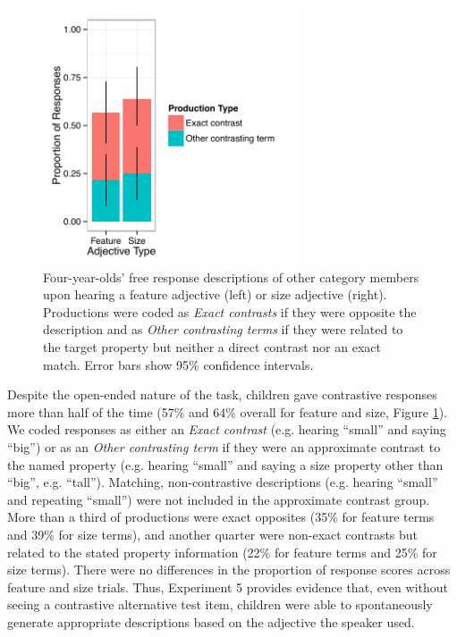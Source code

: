 \documentclass[man]{apa2}
\begin{document}
\begin{figure}[t] 
  \begin{center} 
    \includegraphics[width=3in]{figures/expt3.pdf} 
    \caption{\label{fig:freeResponse} Four-year-olds' free response descriptions of other category members upon hearing a feature adjective (left) or size adjective (right). Productions were coded as \emph{Exact contrasts} if they were opposite the description and as \emph{Other contrasting terms} if they were related to the target property but neither a direct contrast nor an exact match. Error bars show 95\% confidence intervals. }
  \end{center} 
\vspace{-10ex}
\end{figure}

Despite the open-ended nature of the task, children gave contrastive responses more than half of the time (57\% and 64\% overall for feature and size, Figure \ref{fig:freeResponse}).  We coded responses as either an \emph{Exact contrast} (e.g. hearing ``small'' and saying ``big'') or as an \emph{Other contrasting term} if they were an approximate contrast to the named property (e.g. hearing ``small'' and saying a size property other than ``big'', e.g. ``tall''). Matching, non-contrastive descriptions (e.g. hearing ``small'' and repeating ``small'') were not included in the approximate contrast group. More than a third of productions were exact opposites (35\% for feature terms and 39\% for size terms), and another quarter were non-exact contrasts but related to the stated property information (22\% for feature terms and 25\% for size terms). There were no differences in the proportion of response scores across feature and size trials. Thus, Experiment 5 provides evidence that, even without seeing a contrastive alternative test item, children were able to spontaneously generate appropriate descriptions based on the adjective the speaker used. 
\end{document}
